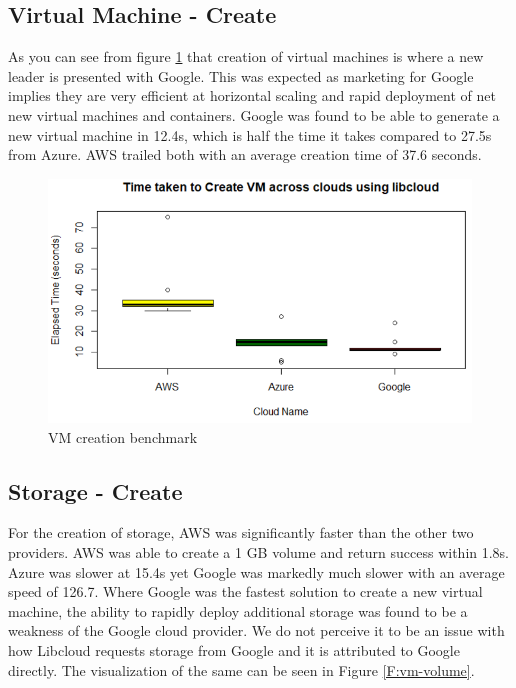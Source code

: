 \subsection{Virtual Machine - Create}

As you can see from figure \ref{F:vm-create} that creation of virtual machines
is where a new leader is presented with 
Google. This was expected as marketing for Google implies they are very
efficient at horizontal scaling and rapid deployment of net new virtual
machines and containers. Google was found to be able to generate a new virtual
machine in 12.4s, which is half the time it takes compared to 27.5s from Azure.
AWS trailed both with an average creation time of 37.6 seconds.

\begin{figure}[!ht]
  \centering
  \includegraphics[width=\columnwidth]{images/CreateVM.png}
  \caption{VM creation benchmark}\label{F:vm-create}
\end{figure}

\subsection{Storage - Create}

For the creation of storage, AWS was significantly faster than the other two
providers. AWS was able to create a 1 GB volume and return success within 1.8s.
Azure was slower at 15.4s yet Google was markedly much slower with an average
speed of 126.7. Where Google was the fastest solution to create a new virtual
machine, the ability to rapidly deploy additional storage was found to be a
weakness of the Google cloud provider. We do not perceive it to be an issue
with how Libcloud requests storage from Google and it is attributed to Google
directly. The visualization of the same can be seen in Figure \ref{F:vm-volume}. 

